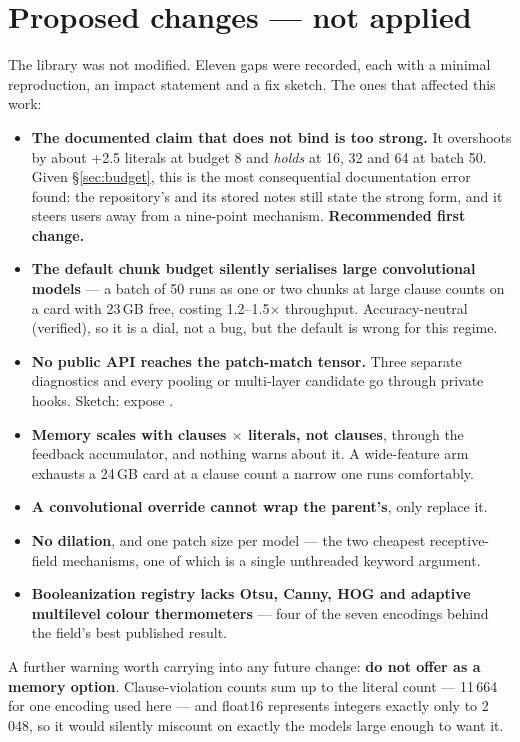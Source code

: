 \section{Proposed  changes --- not applied}
\label{sec:library}

The library was not modified. Eleven gaps were recorded, each with a minimal reproduction, an impact
statement and a fix sketch. The ones that affected this work:

\begin{itemize}
\item \textbf{The documented claim that  does not bind is too strong.}
      It overshoots by about +2.5 literals at budget 8 and \emph{holds} at 16, 32 and 64 at batch 50.
      Given \S\ref{sec:budget}, this is the most consequential documentation error found: the
      repository's  and its stored notes still state the strong form, and it steers
      users away from a nine-point mechanism. \textbf{Recommended first change.}
\item \textbf{The default chunk budget silently serialises large convolutional models} --- a batch of
      50 runs as one or two chunks at large clause counts on a card with 23\,GB free, costing
      1.2--1.5$\times$ throughput. Accuracy-neutral (verified), so it is a dial, not a bug, but the
      default is wrong for this regime.
\item \textbf{No public API reaches the patch-match tensor.} Three separate diagnostics and every
      pooling or multi-layer candidate go through private hooks. Sketch: expose
      .
\item \textbf{Memory scales with clauses $\times$ literals, not clauses}, through the feedback
      accumulator, and nothing warns about it. A wide-feature arm exhausts a 24\,GB card at a clause
      count a narrow one runs comfortably.
\item \textbf{A convolutional  override cannot wrap the parent's}, only replace it.
\item \textbf{No dilation}, and one patch size per model --- the two cheapest receptive-field
      mechanisms, one of which is a single unthreaded keyword argument.
\item \textbf{Booleanization registry lacks Otsu, Canny, HOG and adaptive multilevel colour
      thermometers} --- four of the seven encodings behind the field's best published result.
\end{itemize}

A further warning worth carrying into any future change: \textbf{do not offer  as a
memory option}. Clause-violation counts sum up to the literal count --- 11\,664 for one encoding used
here --- and float16 represents integers exactly only to 2\,048, so it would silently miscount on
exactly the models large enough to want it.
